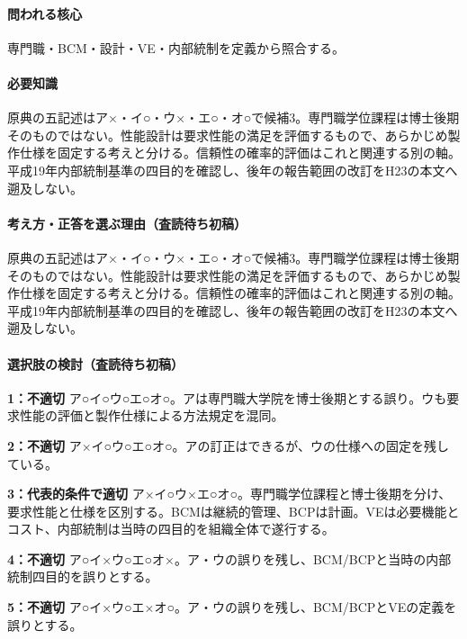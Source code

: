 \paragraph{問われる核心} 専門職・BCM・設計・VE・内部統制を定義から照合する。

\paragraph{必要知識} 原典の五記述はア×・イ○・ウ×・エ○・オ○で候補3。専門職学位課程は博士後期そのものではない。性能設計は要求性能の満足を評価するもので、あらかじめ製作仕様を固定する考えと分ける。信頼性の確率的評価はこれと関連する別の軸。平成19年内部統制基準の四目的を確認し、後年の報告範囲の改訂をH23の本文へ遡及しない。

\paragraph{考え方・正答を選ぶ理由（査読待ち初稿）} 原典の五記述はア×・イ○・ウ×・エ○・オ○で候補3。専門職学位課程は博士後期そのものではない。性能設計は要求性能の満足を評価するもので、あらかじめ製作仕様を固定する考えと分ける。信頼性の確率的評価はこれと関連する別の軸。平成19年内部統制基準の四目的を確認し、後年の報告範囲の改訂をH23の本文へ遡及しない。

\paragraph{選択肢の検討（査読待ち初稿）}\mbox{}\par

\noindent\textbf{1：不適切} ア○イ○ウ○エ○オ○。アは専門職大学院を博士後期とする誤り。ウも要求性能の評価と製作仕様による方法規定を混同。\par

\noindent\textbf{2：不適切} ア×イ○ウ○エ○オ○。アの訂正はできるが、ウの仕様への固定を残している。\par

\noindent\textbf{3：代表的条件で適切} ア×イ○ウ×エ○オ○。専門職学位課程と博士後期を分け、要求性能と仕様を区別する。BCMは継続的管理、BCPは計画。VEは必要機能とコスト、内部統制は当時の四目的を組織全体で遂行する。\par

\noindent\textbf{4：不適切} ア○イ×ウ○エ○オ×。ア・ウの誤りを残し、BCM/BCPと当時の内部統制四目的を誤りとする。\par

\noindent\textbf{5：不適切} ア○イ×ウ○エ×オ○。ア・ウの誤りを残し、BCM/BCPとVEの定義を誤りとする。\par

